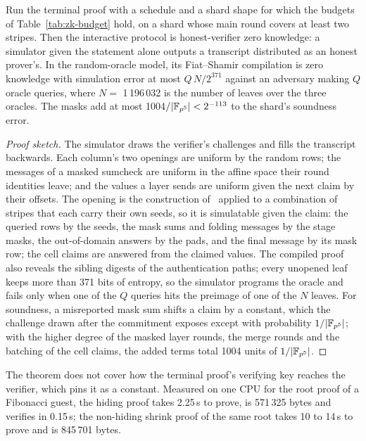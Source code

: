 \begin{theorem}
\label{thm:zk}
Run the terminal proof with a schedule and a shard shape for which the budgets of Table~\ref{tab:zk-budget} hold, on a shard whose main round covers at least two stripes. Then the interactive protocol is honest-verifier zero knowledge: a simulator given the statement alone outputs a transcript distributed as an honest prover's. In the random-oracle model, its Fiat--Shamir compilation is zero knowledge with simulation error at most $Q\, N / 2^{371}$ against an adversary making $Q$ oracle queries, where $N = $ 1\,196\,032 is the number of leaves over the three oracles. The masks add at most 1004$/|\mathbb{F}_{p^5}| < 2^{-113}$ to the shard's soundness error.
\end{theorem}
\begin{proof}[Proof sketch]
The simulator draws the verifier's challenges and fills the transcript backwards. Each column's two openings are uniform by the random rows; the messages of a masked sumcheck are uniform in the affine space their round identities leave; and the values a \LogUp{} layer sends are uniform given the next claim by their offsets. The opening is the construction of~\citep{cfw26} applied to a combination of stripes that each carry their own seeds, so it is simulatable given the claim: the queried rows by the seeds, the mask sums and folding messages by the stage masks, the out-of-domain answers by the pads, and the final message by its mask row; the cell claims are answered from the claimed values. The compiled proof also reveals the sibling digests of the authentication paths; every unopened leaf keeps more than 371 bits of entropy, so the simulator programs the oracle and fails only when one of the $Q$ queries hits the preimage of one of the $N$ leaves. For soundness, a misreported mask sum shifts a claim by a constant, which the challenge drawn after the commitment exposes except with probability $1/|\mathbb{F}_{p^5}|$; with the higher degree of the masked layer rounds, the merge rounds and the batching of the cell claims, the added terms total 1004 units of $1/|\mathbb{F}_{p^5}|$.
\end{proof}

The theorem does not cover how the terminal proof's verifying key reaches the verifier, which pins it as a constant. Measured on one CPU for the root proof of a Fibonacci guest, the hiding proof takes 2.25\,s to prove, is 571\,325 bytes and verifies in 0.15\,s; the non-hiding shrink proof of the same root takes 10 to 14\,s to prove and is 845\,701 bytes.

